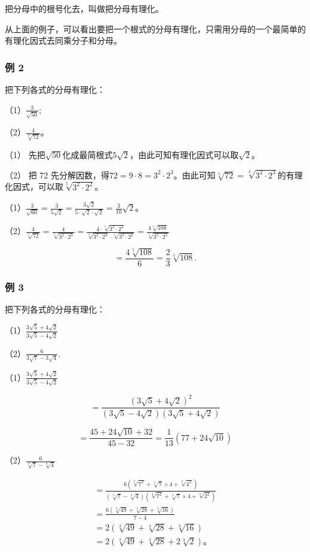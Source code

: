 把分母中的根号化去，叫做把分母有理化。

从上面的例子，可以看出要把一个根式的分母有理化，只需用分母的一个最简单的有理化因式去同乘分子和分母。

\subsubsection{例 2}

把下列各式的分母有理化：

（1）\(\frac{3}{\sqrt{50}};\)

（2）\(\frac{4}{\sqrt[3]{72}}\)。

 （1）
先把\(\sqrt{50}\)化成最简根式\(5\sqrt{2}\)，由此可知有理化因式可以取\(\sqrt{2}\)。

（2） 把 72
先分解因数，得\(72 = 9 \cdot 8 = 3^{2} \cdot 2^{3}\)。由此可知\(\sqrt[5]{72} = \sqrt[3]{3^{2} \cdot 2^{3}}\)的有理化因式，可以取\(\sqrt[5]{3^{2} \cdot 2^{2}}\)。

（1）\(\frac{3}{\sqrt{60}} = \frac{3}{5\sqrt{2}} = \frac{3\sqrt{2}}{5\cdot\sqrt{2}\cdot\sqrt{2}} = \frac{3}{10}\sqrt{2}\)。

（2）\(\frac{4}{\sqrt[5]{72}} = \frac{4}{\sqrt[5]{3^2 \cdot 2^3}} = \frac{4 \cdot \sqrt[5]{3^2 \cdot 2^2}}{\sqrt[5]{3^2 \cdot 2^3} \cdot \sqrt[5]{3^3 \cdot 2^2}} = \frac{4\sqrt[5]{108}}{\sqrt[5]{3^5 \cdot 2^5}}\)

\[
= \frac{4 \sqrt[5]{108}}{6} = \frac{2}{3} \sqrt[5]{108}.
\]

\subsubsection{例 3}

把下列各式的分母有理化：

（1）\(\frac{3\sqrt{5} + 4\sqrt{2}}{3\sqrt{5} - 4\sqrt{2}}\)

（2）\(\frac{6}{3\sqrt{7} - 3\sqrt{4}}.\)

（1）\(\frac{3\sqrt{5} + 4\sqrt{2}}{3\sqrt{5} - 4\sqrt{2}}\)

\[
= \frac{(3 \sqrt {5} + 4 \sqrt {2}) ^ {2}}{(3 \sqrt {5} - 4 \sqrt {2}) (3 \sqrt {5} + 4 \sqrt {2})}
\]

\[
= \frac{45 + 24 \sqrt {10} + 32}{45 - 32} = \frac{1}{13} (77 + 24 \sqrt {10})
\]

（2）\(\frac{6}{\sqrt[3]{7} - \sqrt[3]{4}}\)

\[
\begin{array}{l} = \frac{6 (\sqrt[3]{7 ^ {2}} + \sqrt[3]{7} \times 4 + \sqrt[3]{4 ^ {2}})}{(\sqrt[3]{7} - \sqrt[3]{4}) (\sqrt[3]{7 ^ {2}} + \sqrt[3]{7} \times 4 + \sqrt[3]{2 ^ {2}})} \\ = \frac{6 (\sqrt[3]{49} + \sqrt[3]{28} + \sqrt[3]{16})}{7 - 4} \\ = 2 \left(\sqrt[3]{49} + \sqrt[3]{28} + \sqrt[3]{16}\right) \\ = 2 \left(\sqrt[3]{49} + \sqrt[3]{28} + 2 \sqrt[3]{2}\right)\text{。} \\ \end{array}
\]

